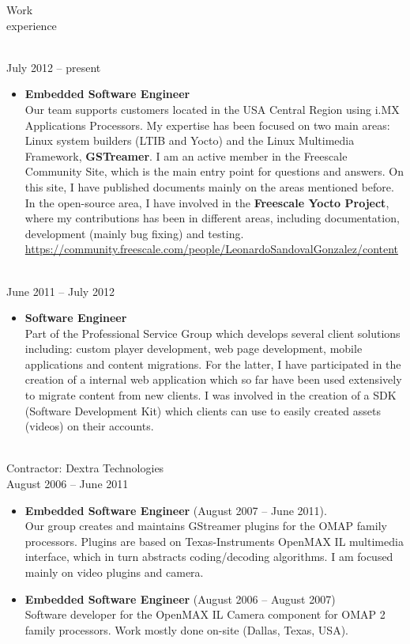 \documentclass{resume}
\begin{document}
\begin{category}{Work \\experience}

\\
 July 2012 -- present
\begin{itemize}
\item \textbf{Embedded Software Engineer}\\
Our team supports customers located in the USA Central Region using i.MX Applications
Processors. My expertise has been focused on two main areas:
Linux system builders (LTIB and Yocto) and the Linux Multimedia Framework, \textbf{GSTreamer}. I am an active member in the Freescale Community Site, which is the main entry point for questions and answers. On this site, I have published documents mainly on the areas mentioned before. In the open-source area, I have involved in the \textbf{Freescale Yocto Project}, where my contributions has been in different areas, including documentation, development (mainly bug fixing) and testing. \url{https://community.freescale.com/people/LeonardoSandovalGonzalez/content}
\end{itemize}

\\
 June 2011 -- July 2012
\begin{itemize}
\item \textbf{Software Engineer}\\
Part of the Professional Service Group which develops several client solutions including: 
custom player development, web page development, mobile applications and content migrations.
For the latter, I have participated in the creation of a internal web application which so 
far have been used extensively to migrate content from new clients. I was involved in the creation of a SDK (Software Development Kit) which clients can use to easily created assets (videos) on their accounts.
\end{itemize}

\\
Contractor: Dextra Technologies\\
August 2006 -- June 2011
\begin{itemize}
\item \textbf{Embedded Software Engineer} (August 2007 -- June 2011).\\
Our group creates and maintains GStreamer plugins for the OMAP family processors. Plugins are based on Texas-Instruments OpenMAX IL multimedia interface,
which in turn abstracts coding/decoding algorithms. I am focused mainly on video plugins and camera.\\
\item \textbf{Embedded Software Engineer} (August 2006 -- August 2007)\\
Software developer for the OpenMAX IL Camera component for OMAP 2 family processors. Work mostly done on-site (Dallas, Texas, USA).\\
\end{itemize}
\end{category}
\end{document}
